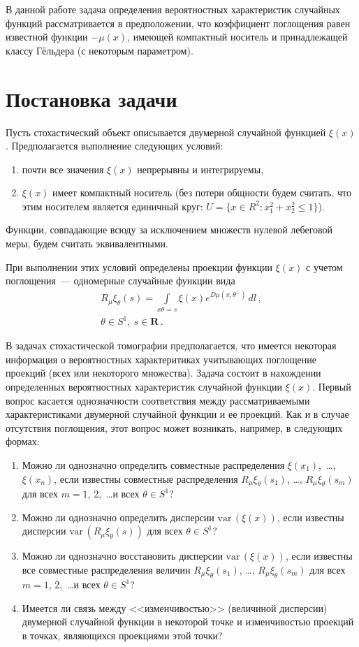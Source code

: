 \begin{multicols}{2}
В данной работе задача определения вероятностных характеристик случайных
функций рассматривается в предположении, что коэффициент
поглощения равен известной функции $-\mu(x)$, имеющей компактный
носитель и принадлежащей классу Гёльдера (с некоторым параметром).

\section{Постановка задачи}

Пусть стохастический
объект описывается двумерной случайной функцией $\xi(x)$. Предполагается выполнение следующих условий: 
\begin{enumerate}[(1)]
\item почти все значения
$\xi(x)$ непрерывны и интегрируемы, \item 
$\xi(x)$ имеет компактный
носитель (без потери общ\-ности будем считать, что этим носителем
является единичный круг: $U=\{x\in R^2:x_1^2+x_2^2\leq 1\}$).
\end{enumerate}
Функции, совпадающие всюду за исключением множеств нулевой
лебеговой меры, будем считать эквивалентными.

При выполнении этих условий определены проекции
функции $\xi(x)$ с учетом поглощения~--- одномерные случайные
функции вида
\begin{multline}
R_\mu\xi_{\theta}(s)=\int\limits_{x\theta=s}\xi(x)e^{D\mu(x,\theta^{\perp})}\,dl\,,\\
 \theta\in S^1,\ s\in\mathbf{R}\,.
\label{e2u}
\end{multline}

В задачах стохастической томографии предполагается, что
имеется некоторая информация о вероятностных характеритиках
учитывающих поглощение проекций (всех или некоторого множества).
Задача состоит в нахождении определенных вероятностных
характеристик случайной функции $\xi(x)$. Первый вопрос касается
однозначности соответствия между рассматриваемыми характеристиками
двумерной случайной функции и ее проекций. Как и в случае
отсутствия поглощения, этот вопрос может возникать, например, в
следующих формах:
\begin{enumerate}[1.]
\item  Можно ли однозначно определить
совместные распределения $\xi(x_1)$,\ \ldots , $\xi(x_n)$, если
известны совместные распределения $R_\mu\xi_{\theta}(s_1)$, \ldots ,
$R_\mu\xi_{\theta}(s_m)$ для всех $m=1$, 2,\ \ldots  и всех $\theta\in
S^1$?
\item Можно ли однозначно определить дис\-пер\-сии $\mathrm{var}\,(\xi(x))$, если известны дисперсии 
$\mathrm{var}\,(R_\mu\xi_{\theta}(s))$ для всех $\theta\in S^1$?
\item Можно
ли однозначно восстановить дис\-пе\-рсии $\mathrm{var}\,(\xi(x))$, если
известны все совместные распределения величин
$R_\mu\xi_{\theta}(s_1)$, \ldots , $R_\mu\xi_{\theta}(s_m)$ для всех
$m=1$, 2,\ \ldots  и всех $\theta\in S^1$?
\item  Имеется ли связь между
<<изменчивостью>> (величиной дисперсии) двумерной случайной
функции в некоторой точке и изменчивостью проекций в точках,
являющихся проекциями этой точки?
\end{enumerate}


\end{multicols}
